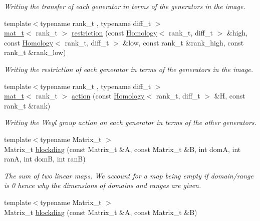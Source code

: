 \begin{DoxyCompactItemize}
\begin{DoxyCompactList}\small\item\em Writing the transfer of each generator in terms of the generators in the image. \end{DoxyCompactList}\item 
{\footnotesize template$<$typename rank\+\_\+t , typename diff\+\_\+t $>$ }\\\hyperlink{namespaceMackey_a035386035757dade630f685e508e5cf9}{mat\+\_\+t}$<$ rank\+\_\+t $>$ \hyperlink{namespaceMackey_a6818760aa9590810daace862e4c71f04}{restriction} (const \hyperlink{classMackey_1_1Homology}{Homology}$<$ rank\+\_\+t, diff\+\_\+t $>$ \&high, const \hyperlink{classMackey_1_1Homology}{Homology}$<$ rank\+\_\+t, diff\+\_\+t $>$ \&low, const rank\+\_\+t \&rank\+\_\+high, const rank\+\_\+t \&rank\+\_\+low)
\begin{DoxyCompactList}\small\item\em Writing the restriction of each generator in terms of the generators in the image. \end{DoxyCompactList}\item 
{\footnotesize template$<$typename rank\+\_\+t , typename diff\+\_\+t $>$ }\\\hyperlink{namespaceMackey_a035386035757dade630f685e508e5cf9}{mat\+\_\+t}$<$ rank\+\_\+t $>$ \hyperlink{namespaceMackey_aaa66c9857ba86a13949d1b1825ea20f7}{action} (const \hyperlink{classMackey_1_1Homology}{Homology}$<$ rank\+\_\+t, diff\+\_\+t $>$ \&H, const rank\+\_\+t \&rank)
\begin{DoxyCompactList}\small\item\em Writing the Weyl group action on each generator in terms of the other generators. \end{DoxyCompactList}\item 
{\footnotesize template$<$typename Matrix\+\_\+t $>$ }\\Matrix\+\_\+t \hyperlink{namespaceMackey_a6d2d912037da84c6884ac62db997cc0f}{blockdiag} (const Matrix\+\_\+t \&A, const Matrix\+\_\+t \&B, int domA, int ranA, int domB, int ranB)
\begin{DoxyCompactList}\small\item\em The sum of two linear maps. We account for a map being empty if domain/range is 0 hence why the dimensions of domains and ranges are given. \end{DoxyCompactList}\item 
{\footnotesize template$<$typename Matrix\+\_\+t $>$ }\\Matrix\+\_\+t \hyperlink{namespaceMackey_a64d299f4b6f36e4b4e873b56a44b14b0}{blockdiag} (const Matrix\+\_\+t \&A, const Matrix\+\_\+t \&B)

\end{DoxyCompactItemize}

